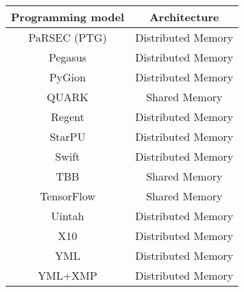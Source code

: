 \begin{tabular}{cc}
\hline
Programming model & Architecture \\
\hline
PaRSEC (PTG) & Distributed Memory\\
Pegasus & Distributed Memory\\
PyGion & Distributed Memory\\
QUARK & Shared Memory\\
Regent & Distributed Memory\\
StarPU & Distributed Memory\\
Swift & Distributed Memory\\
TBB & Shared Memory\\
TensorFlow & Shared Memory\\
Uintah & Distributed Memory\\
X10 & Distributed Memory\\
YML & Distributed Memory\\
YML+XMP & Distributed Memory\\
\hline
\end{tabular}

